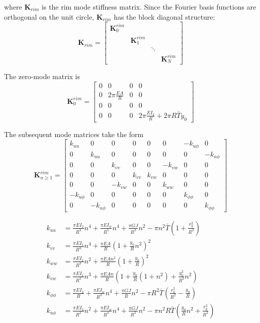 \documentclass[\rootdir/thesis.tex]{subfiles}
\begin{document}
where $\mathbf{K}_{rim}$ is the rim mode stiffness matrix. Since the Fourier basis functions are orthogonal on the unit circle, $\mathbf{K}_{rim}$ has the block diagonal structure:
\begin{equation}
\label{eq:mm_K_rim}
\mathbf{K}_{rim} =
\begin{bmatrix}
\mathbf{K}_0^{rim} & & &\\
& \mathbf{K}_1^{rim} & &\\
& & \ddots &\\
& & & \mathbf{K}_N^{rim}
\end{bmatrix}
\end{equation}

The zero-mode matrix is
\begin{equation}
\mathbf{K}_0^{rim} =
\begin{bmatrix}
0 & 0 & 0 & 0\\
0 & 2\pi \frac{EA}{R} & 0 & 0\\
0 & 0 & 0 & 0\\
0 & 0 & 0 & 2\pi \frac{EI_2}{R} + 2\pi R\bar{T}y_0
\end{bmatrix}
\end{equation}

The subsequent mode matrices take the form
\begin{equation}
\mathbf{K}_{n\geq 1}^{rim} =
\begin{bmatrix}
k_{uu} & 0 & 0 & 0 & 0 & 0 & -k_{u\phi} & 0\\
0 & k_{uu} & 0 & 0 & 0 & 0 & 0 & -k_{u\phi}\\
0 & 0 & k_{vv} & 0 & 0 & -k_{vw} & 0 & 0\\
0 & 0 & 0 & k_{vv} & k_{vw} & 0 & 0 & 0\\
0 & 0 & -k_{vw} & 0 & 0 & k_{ww} & 0 & 0\\
-k_{u\phi} & 0 & 0 & 0 & 0 & 0 & k_{\phi\phi} & 0\\
0 & -k_{u\phi} & 0 & 0 & 0 & 0 & 0 & k_{\phi\phi}
\end{bmatrix}
\end{equation}

\begin{align*}
k_{uu} &= \frac{\pi EI_2}{R^3}n^4 + \frac{\pi EI_w}{R^5}n^4 + \frac{\pi GJ}{R^3}n^2 - \pi n^2 \bar{T}\left(1 + \frac{r_y^2}{R^2}\right)\\
k_{vv} &= \frac{\pi EI_1}{R^3}n^4 + \frac{\pi EA}{R}\left(1 + \frac{y_0}{R}n^2 \right)^2\\
k_{ww} &= \frac{\pi EI_1}{R^3}n^2 + \frac{\pi EA n^2}{R}\left(1 + \frac{y_0}{R} \right)^2\\
k_{vw} &= \frac{\pi EI_1}{R^3}n^3 + \frac{\pi EA n}{R}\left(1 + \frac{y_0}{R}(1+n^2) + \frac{y_0^2}{R^2}n^2\right)\\
k_{\phi\phi} &= \frac{\pi EI_2}{R} + \frac{\pi EI_w}{R^3}n^4 + \frac{\pi GJ}{R}n^2 - \pi R^2\bar{T}\left(\frac{r_0^2}{R^2}-\frac{y_0}{R}\right)\\
k_{u\phi} &= \frac{\pi EI_2}{R^2}n^2 + \frac{\pi EI_w}{R^4}n^4 + \frac{\pi GJ}{R^2}n^2 - \pi n^2 R \bar{T}\left(\frac{y_0}{R}n^2 + \frac{r_y^2}{R^2}\right)
\end{align*}
\end{document}
